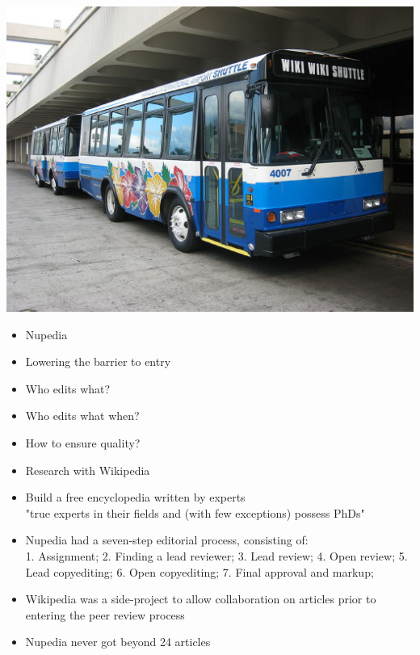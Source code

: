 \documentclass[a4paper,landscape,headrule,footrule,xetex]{foils}
\begin{document}
\begin{center}
  \includegraphics[height=\textheight]{../pics/wiki-shuttle}
\end{center}


\begin{itemize}
\item Nupedia
\item Lowering the barrier to entry
\item Who edits what?
\item Who edits what when?
\item How to ensure quality?
\item Research with Wikipedia
\end{itemize}



\begin{itemize}
\item Build a free encyclopedia written by experts
\\ "true experts in their fields and (with few exceptions) possess PhDs"
\item Nupedia had a seven-step editorial process, consisting of:
\\   1. Assignment;
   2. Finding a lead reviewer;
   3. Lead review;
   4. Open review;
   5. Lead copyediting;
   6. Open copyediting;
   7. Final approval and markup;
 \item Wikipedia was a side-project to allow collaboration on articles prior to entering the peer review process
 \item Nupedia never got beyond 24 articles
 \end{itemize}
 
\end{document}
